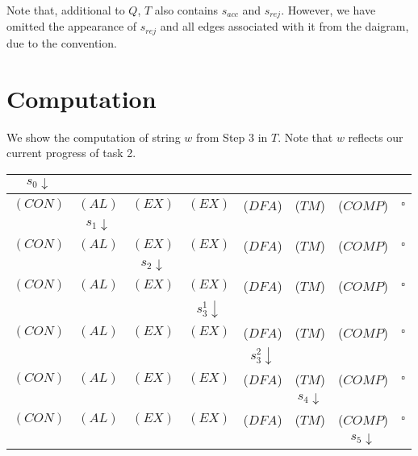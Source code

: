 \documentclass{article}
\begin{document}
Note that, additional to $Q$, $T$ also contains $s_{acc}$ and $s_{rej}$. However, we have omitted the appearance of $s_{rej}$ and all edges associated with it from the daigram, due to the convention.

\section*{Computation}

We show the computation of string $w$ from Step 3 in $T$. Note that $w$ reflects our current progress of task 2.

\begin{center}
  \begin{tabular}{|c|c|c|c|c|c|c|c|}
    \hline
    \multicolumn{1}{|c}{$s_0\downarrow$} &  \multicolumn{7}{c|}{\phantom{A}}\\
    \hline
    $(CON)$ & $(AL)$  & $(EX)$ & $(EX)$ & ($DFA$) & ($TM$) & ($COMP$) & $\square$\\
    \hline
    \multicolumn{1}{|c}{\phantom{A}} & \multicolumn{1}{c}{$s_1\downarrow$} & \multicolumn{6}{c|}{\phantom{A}}\\
    \hline
    $(CON)$ & $(AL)$  & $(EX)$ & $(EX)$ & ($DFA$) & ($TM$) & ($COMP$) & $\square$\\
    \hline
    \multicolumn{2}{|c}{\phantom{A}} & \multicolumn{1}{c}{$s_2\downarrow$} & \multicolumn{5}{c|}{\phantom{A}}\\
    \hline
    $(CON)$ & $(AL)$  & $(EX)$ & $(EX)$ & ($DFA$) & ($TM$) & ($COMP$) & $\square$\\
    \hline
    \multicolumn{3}{|c}{\phantom{A}} & \multicolumn{1}{c}{$s_3^1\downarrow$} & \multicolumn{4}{c|}{\phantom{A}}\\
    \hline
    $(CON)$ & $(AL)$  & $(EX)$ & $(EX)$ & ($DFA$) & ($TM$) & ($COMP$) & $\square$\\
    \hline
    \multicolumn{4}{|c}{\phantom{A}} & \multicolumn{1}{c}{$s_3^2\downarrow$} & \multicolumn{3}{c|}{\phantom{A}}\\          
    \hline
    $(CON)$ & $(AL)$  & $(EX)$ & $(EX)$ & ($DFA$) & ($TM$) & ($COMP$) & $\square$\\
    \hline
    \multicolumn{5}{|c}{\phantom{A}} & \multicolumn{1}{c}{$s_4\downarrow$} & \multicolumn{2}{c|}{\phantom{A}}\\          
    \hline
    $(CON)$ & $(AL)$  & $(EX)$ & $(EX)$ & ($DFA$) & ($TM$) & ($COMP$) & $\square$\\
    \hline
    \multicolumn{6}{|c}{\phantom{A}} & \multicolumn{1}{c}{$s_5\downarrow$} & \multicolumn{1}{c|}{\phantom{A}}\\          

\end{tabular}
\end{center}
\end{document}
